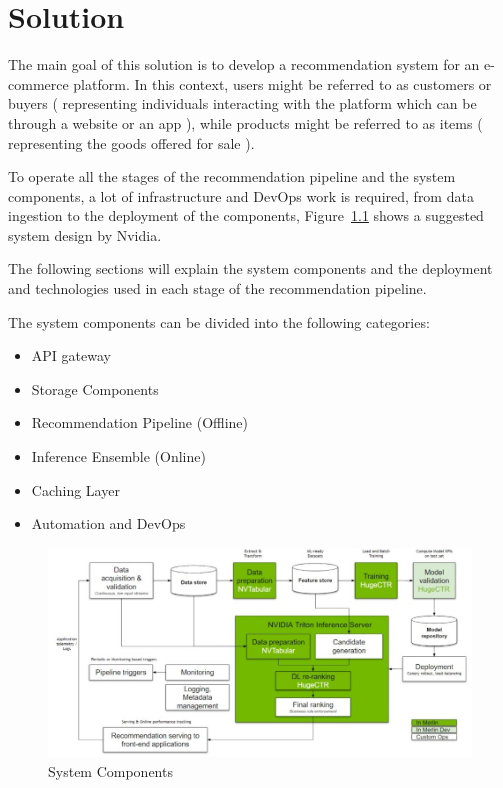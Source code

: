 \chapter{Solution}
\minitoc

The main goal of this solution is to develop a recommendation system for an e-commerce platform. 
In this context, users might be referred to as customers or buyers ( representing individuals interacting with the platform which can be through a website or an app ), 
while products might be referred to as items ( representing the goods offered for sale ).

To operate all the stages of the recommendation pipeline and the system components, 
a lot of infrastructure and DevOps work is required, from data ingestion to the deployment of the components, Figure~\ref{fig: SystemComponents} shows a suggested system design by Nvidia.

The following sections will explain the system components and the deployment and technologies used in each stage of the recommendation pipeline.

The system components can be divided into the following categories:
\begin{itemize}
    \item API gateway
    \item Storage Components
    \item Recommendation Pipeline (Offline)
    \item Inference Ensemble (Online)
    \item Caching Layer
    \item Automation and DevOps
\end{itemize}

\begin{figure}[H]
    \centering
    \includegraphics[width=\textwidth]{assets/components.jpeg}
    \caption[System Components]{System Components~\cite{NvidiaRecSysBestPractices}}
    \label{fig: SystemComponents}
\end{figure}

